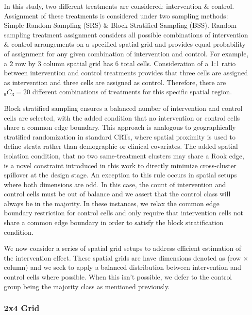 \documentclass{article}[11pt]
\begin{document}
In this study, two different treatments are considered: intervention $\&$ control. Assignment of these treatments is considered under two sampling methods: Simple Random Sampling (SRS) $\&$ Block Stratified Sampling (BSS). Random sampling treatment assignment considers all possible combinations of intervention $\&$ control arrangements on a specified spatial grid and provides equal probability of assignment for any given combination of intervention and control. For example, a 2 row by 3 column spatial grid has 6 total cells. Consideration of a 1:1 ratio between intervention and control treatments provides that three cells are assigned as intervention and three cells are assigned as control. Therefore, there are %
$_{6}C_{3}=20$ different combinations of treatments for this specific spatial region. 

Block stratified sampling ensures a balanced number of intervention and control cells are selected, with the added condition that no intervention or control cells share a common edge boundary. This approach is analogous to geographically stratified randomization in standard CRTs, where spatial proximity is used to define strata rather than demographic or clinical covariates\cite{mccann_spatial_2018}\cite{crisp_covariate-constrained_2023}\cite{hayes_cluster_2017}. The added spatial isolation condition, that no two same-treatment clusters may share a Rook edge, is a novel constraint introduced in this work to directly minimize cross-cluster spillover at the design stage. An exception to this rule occurs in spatial setups where both dimensions are odd. In this case, the count of intervention and control cells must be out of balance and we assert that the control class will always be in the majority. In these instances, we relax the common edge boundary restriction for control cells and only require that intervention cells not share a common edge boundary in order to satisfy the block stratification condition.

We now consider a series of spatial grid setups to address efficient estimation of the intervention effect. These spatial grids are have dimensions denoted as (row $\times$ column) and we seek to apply a balanced distribution between intervention and control cells where possible. When this isn't possible, we defer to the control group being the majority class as mentioned previously.

\subsubsection{2x4 Grid}
\end{document}
